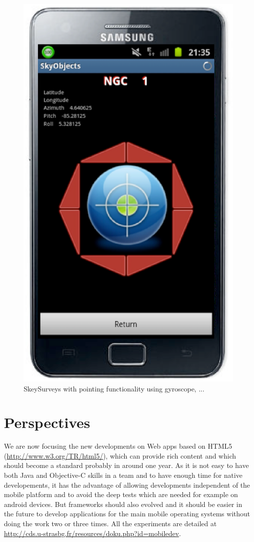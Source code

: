 \begin{figure}[h]
\includegraphics[scale=0.28]{part5/Schaaff_O28/O28_f6.eps}
\caption{SkeySurveys with pointing functionality using gyroscope, ...} 
\label{O28:3}
\end{figure}

\section{Perspectives}
We are now focusing the new developments on Web apps based on HTML5 (\url{http://www.w3.org/TR/html5/}), which can provide rich content and which should become a standard probably in around one year. As it is not easy to have both Java and Objective-C skills in a team and to have enough time for native developements, it has the advantage of allowing developments independent of the mobile platform and to avoid the deep tests which are needed for example on android devices. 
But frameworks should also evolved and it should be easier in the future to develop applications for the main mobile operating systems without doing the work two or three times.
All the experiments are detailed at \url{http://cds.u-strasbg.fr/resources/doku.php?id=mobiledev}.

